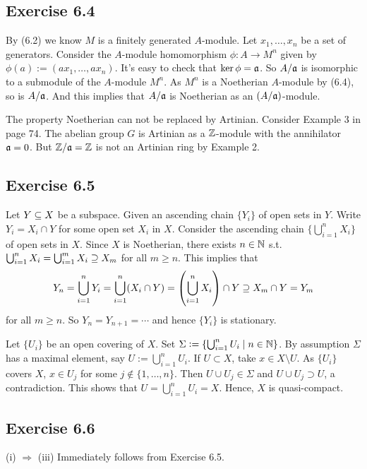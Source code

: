 \documentclass[../A&M.tex]{subfiles}
\begin{document}
\subsection*{Exercise 6.4}

By (6.2) we know $M$ is a finitely generated $A$-module. Let $x_1,\ldots,x_n$ be a set of generators. Consider the $A$-module homomorphism $\phi: A \to M^n$ given by $\phi(a) := (ax_1,\ldots,ax_n)$. It's easy to check that $\ker \phi = \mathfrak{a}$. So $A/\mathfrak{a}$ is isomorphic to a submodule of the $A$-module $M^n$. As $M^n$ is a Noetherian $A$-module by (6.4), so is $A/\mathfrak{a}$. And this implies that $A/\mathfrak{a}$ is Noetherian as an $(A/\mathfrak{a})$-module.

The property Noetherian can not be replaced by Artinian. Consider Example 3 in page 74. The abelian group $G$ is Artinian as a $\mathbb{Z}$-module with the annihilator $\mathfrak{a}=0$. But $\mathbb{Z}/\mathfrak{a} = \mathbb{Z}$ is not an Artinian ring by Example 2.

\subsection*{Exercise 6.5}

Let $Y\subseteq X$ be a subspace. Given an ascending chain $\{Y_i\}$ of open sets in $Y$. Write $Y_i = X_i \cap Y$ for some open set $X_i$ in $X$. Consider the ascending chain $\{\bigcup_{i=1}^n X_i\}$ of open sets in $X$. Since $X$ is Noetherian, there exists $n\in\mathbb{N}$ s.t. $\bigcup_{i=1}^n X_i = \bigcup_{i=1}^m X_i \supseteq X_m$ for all $m\geq n$. This implies that
$$
Y_n = \bigcup_{i=1}^n Y_i = \bigcup_{i=1}^n (X_i \cap Y) = \left( \bigcup_{i=1}^n X_i \right) \cap Y \supseteq X_m \cap Y = Y_m
$$
for all $m\geq n$. So $Y_n = Y_{n+1} = \cdots$ and hence $\{Y_i\}$ is stationary.

Let $\{U_i\}$ be an open covering of $X$. Set $\Sigma := \{ \bigcup_{i=1}^n U_i \mid n\in\mathbb{N} \}$. By assumption $\Sigma$ has a maximal element, say $U := \bigcup_{i=1}^n U_i$. If $U \subset X$, take $x \in X \setminus U$. As $\{U_i\}$ covers $X$, $x\in U_j$ for some $j \notin \{1,\ldots,n\}$. Then $U \cup U_j \in \Sigma$ and $U \cup U_j \supset U$, a contradiction. This shows that $U = \bigcup_{i=1}^n U_i = X$. Hence, $X$ is quasi-compact.

\subsection*{Exercise 6.6}

(i) $\Rightarrow$ (iii) Immediately follows from Exercise 6.5.
\end{document}
